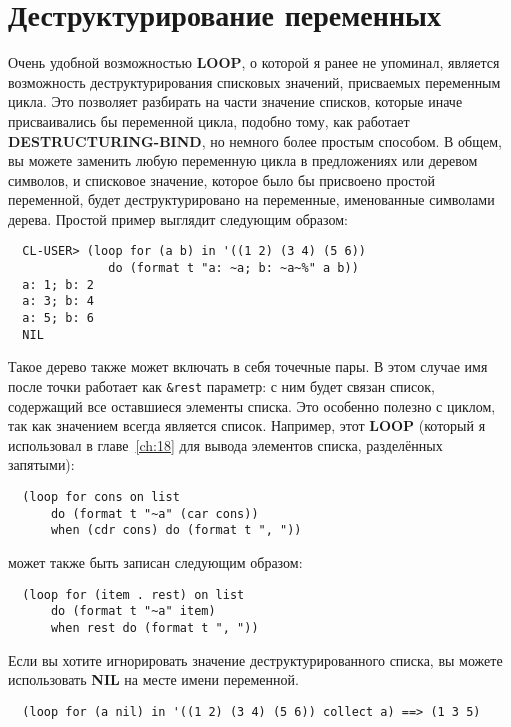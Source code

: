\section{Деструктурирование переменных}

Очень удобной возможностью \textbf{LOOP}, о которой я ранее не упоминал, является
возможность деструктурирования списковых значений, присваемых переменным цикла. Это
позволяет разбирать на части значение списков, которые иначе присваивались бы переменной
цикла, подобно тому, как работает \textbf{DESTRUCTURING-BIND}, но немного более простым
способом. В общем, вы можете заменить любую переменную цикла в предложениях  или
 деревом символов, и списковое значение, которое было бы присвоено простой
переменной, будет деструктурировано на переменные, именованные символами дерева. Простой
пример выглядит следующим образом:

\begin{verbatim}
  CL-USER> (loop for (a b) in '((1 2) (3 4) (5 6))
              do (format t "a: ~a; b: ~a~%" a b))
  a: 1; b: 2
  a: 3; b: 4
  a: 5; b: 6
  NIL
\end{verbatim}

Такое дерево также может включать в себя точечные пары. В этом случае имя после точки
работает как \lstinline!&rest! параметр: с ним будет связан список, содержащий все
оставшиеся элементы списка. Это особенно полезно с  циклом, так как значением
всегда является список. Например, этот \textbf{LOOP} (который я использовал в
главе~\ref{ch:18} для вывода элементов списка, разделённых запятыми):

\begin{lstlisting}
  (loop for cons on list
      do (format t "~a" (car cons))
      when (cdr cons) do (format t ", "))
\end{lstlisting}

может также быть записан следующим образом:

\begin{lstlisting}
  (loop for (item . rest) on list
      do (format t "~a" item)
      when rest do (format t ", "))
\end{lstlisting}

Если вы хотите игнорировать значение деструктурированного списка, вы можете использовать
\textbf{NIL} на месте имени переменной.

\begin{lstlisting}
  (loop for (a nil) in '((1 2) (3 4) (5 6)) collect a) ==> (1 3 5)
\end{lstlisting}

